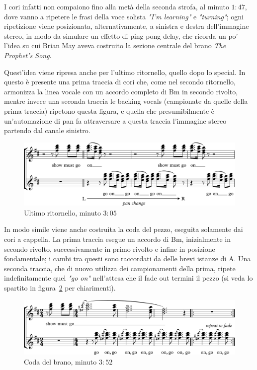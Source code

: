 \documentclass[12pt]{article}
\begin{document}
I cori infatti non compaiono fino alla metà della seconda strofa, al minuto \(1:47\), dove vanno a ripetere le frasi della voce solista \emph{"I'm learning"} e \emph{"turning"}; ogni ripetizione viene posizionata, alternativamente, a sinistra e destra dell'immagine stereo, in modo da simulare un effetto di ping-pong delay, che ricorda un po' l'idea su cui Brian May aveva costruito la sezione centrale del brano \emph{The Prophet's Song}.

Quest'idea viene ripresa anche per l'ultimo ritornello, quello dopo lo special. In questo è presente una prima traccia di cori che, come nel secondo ritornello, armonizza la linea vocale con un accordo completo di Bm in secondo rivolto, mentre invece una seconda traccia le backing vocals (campionate da quelle della prima traccia) ripetono questa figura, e quella che presumibilmente è un'automazione di pan fa attraversare a questa traccia l'immagine stereo partendo dal canale sinistro.

\begin{figure}[H]
 \centering
 \includegraphics[width=\textwidth,keepaspectratio]{back_vox/choir1}
 \caption{Ultimo ritornello, minuto \(3:05\)}
 \label{fig:choir1}
\end{figure}

In modo simile viene anche costruita la coda del pezzo, eseguita solamente dai cori a cappella. La prima traccia esegue un accordo di Bm, inizialmente in secondo rivolto, successivamente in primo rivolto e infine in posizione fondamentale; i cambi tra questi sono raccordati da delle brevi istanze di A. Una seconda traccia, che di nuovo utilizza dei campionamenti della prima, ripete indefinitamente quel \emph{"go on"} nell'attesa che il fade out termini il pezzo (si veda lo spartito in figura~\ref{fig:choir2} per chiarimenti).

\begin{figure}[H]
 \centering
 \includegraphics[width=\textwidth,keepaspectratio]{back_vox/choir2}
 \caption{Coda del brano, minuto \(3:52\)}
 \label{fig:choir2}
\end{figure}
\end{document}
